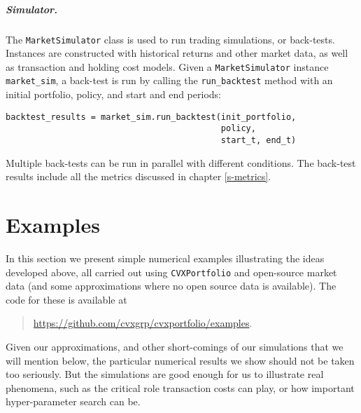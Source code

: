 \documentclass[openany]{now}
\begin{document}
\paragraph{Simulator.} The \verb|MarketSimulator| class is used to run trading
simulations, or back-tests.
Instances are constructed with historical returns and other market data, as well
as transaction and holding cost models.
Given a \verb|MarketSimulator| instance \verb|market_sim|, a back-test is run by calling the
\verb|run_backtest| method with an initial portfolio, policy, and start and end
periods:
\begin{verbatim}
backtest_results = market_sim.run_backtest(init_portfolio,
                                           policy,
                                           start_t, end_t)
\end{verbatim}
Multiple back-tests can be run in parallel with different conditions.
The back-test results include all the metrics discussed in chapter \ref{s-metrics}.

\chapter{Examples}\label{s-examples}
In this section we present
simple numerical examples illustrating the ideas developed
above, all carried out using \verb|CVXPortfolio| and
open-source market data (and some approximations where no open
source data is available).
The code for these is available at
\begin{quote}
\mbox{\url{https://github.com/cvxgrp/cvxportfolio/examples}.}
\end{quote}
Given our approximations, and other short-comings of our simulations
that we will mention below,
the particular numerical results we show should not be taken
too seriously.  But the simulations are good enough for us to illustrate
real phenomena, such as the critical role transaction costs
can play, or how important hyper-parameter search can be.
\end{document}
